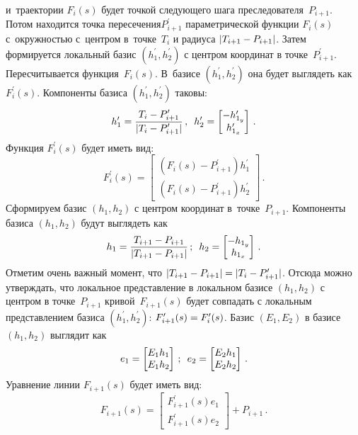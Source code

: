 \begin{multicols}{2}
\noindent
 и~траектории $F_i(s)$ будет точкой следующего шага преследователя~$P_{i+1}$. 
Потом находится точка пересечения$P^\prime_{i+1}$ параметрической 
функции $F_i(s)$ с~окруж\-ностью с~цент\-ром в~точ\-ке~$T_i$ и радиуса $\vert 
T_{i+1}\hm- P_{i+1}\vert$. Затем формируется локальный базис $(h_1^\prime, 
h_2^\prime)$ с центром координат в точке~$P^\prime_{i+1}$. Пересчитывается 
функция~$F_i(s)$. В~базисе $(h_1^\prime, h_2^\prime)$ она будет выглядеть как 
$F^\prime_i(s)$. Компоненты базиса $(h_1^\prime, h_2^\prime)$ таковы: 
$$
h_1^\prime= \displaystyle\frac{\displaystyle T_i-P^\prime_{i+1}\mathstrut}{\displaystyle \vert T_i -P^\prime_{i+1}\vert\mathstrut}\,,\enskip
h_2^\prime= \begin{bmatrix}
-h_{1_y}^\prime\\ h^\prime_{1_x}
\end{bmatrix}\,.
$$
Функция $F_i^\prime(s)$ будет иметь вид:
$$
F^\prime_i(s)= \begin{bmatrix}
\left( F_i(s)-P^\prime_{i+1}\right) h_1^\prime\\[3pt]
\left( F_i(s) -P^\prime_{i+1}\right) h_2^\prime
\end{bmatrix}\,.
$$
Сформируем базис $(h_1, h_2)$ с центром координат в~точке~$P_{i+1}$. 
Компоненты базиса $(h_1, h_2)$ будут выглядеть как 
$$
h_1= \displaystyle\frac{\displaystyle T_{i+1}-P_{i+1}\mathstrut}{\displaystyle \vert T_{i+1} -P_{i+1}\vert\mathstrut}\,;\enskip
h_2= \begin{bmatrix}
-h_{1_y}\\ h_{1_x}
\end{bmatrix}\,.
$$
Отметим очень важный момент, что $\vert T_{i+1}\hm- P_{i+1}\vert \hm= \vert 
T_i\hm- P^\prime_{i+1}\vert$. Отсюда можно утверждать, что локальное 
представление в локальном базисе $(h_1, h_2)$ с центром в точке~$P_{i+1}$ 
кривой~$F_{i+1}(s)$ будет совпадать с локальным представлением базиса 
$(h_1^\prime, h_2^\prime)$: $F^\prime_{i+1}(s)\hm= F_i^\prime(s)$. Базис $(E_1, 
E_2)$ в базисе $(h_1, h_2)$ выглядит как
$$
e_1= \begin{bmatrix}
E_1  h_1\\
E_1  h_2\end{bmatrix}\,;\enskip
e_2= \begin{bmatrix}
E_2  h_1\\
E_2 h_2\end{bmatrix}\,.
$$
Уравнение линии $F_{i+1}(s)$ будет иметь вид:
$$
F_{i+1}(s) = \begin{bmatrix} F^\prime_{i+1}(s) e_1\\[3pt]
F^\prime_{i+1}(s) e_2\end{bmatrix}
+P_{i+1}\,.
$$




\end{multicols}
